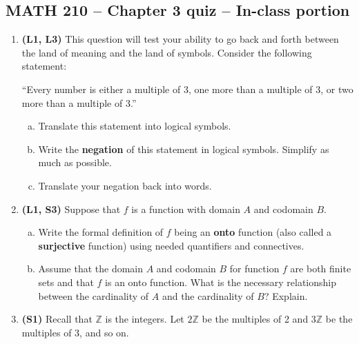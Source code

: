\documentclass[12pt]{article}
\begin{document}
\pagestyle{empty}
\begin{center}
\section*{MATH 210 -- Chapter 3 quiz -- In-class portion}
\end{center}
\begin{enumerate}
	
\item %
\textbf{(L1, L3)}
This question will test your ability to go back and forth between the land of meaning and the land of symbols. Consider the following statement:
\begin{center}
	``Every number is either a multiple of 3, one more than a multiple of 3, or two more than a multiple of 3.''
\end{center}
\begin{enumerate}[(a)]
	\item Translate this statement into logical symbols.
	
	\item Write the \textbf{negation} of this statement in logical symbols. Simplify as much as possible.
	
	\item Translate your negation back into words.
	
\end{enumerate}

\item %
\textbf{(L1, S3)} Suppose that $f$ is a function with domain $A$ and codomain $B$.

\begin{enumerate}[(a)]
	\item
	Write the formal definition of $f$ being an \textbf{onto} function (also called a \textbf{surjective} function) using needed quantifiers and connectives.
	
	\item
	Assume that the domain $A$ and codomain $B$ for function $f$ are both finite sets and that $f$ is an onto function. What is the necessary relationship between the cardinality of $A$ and the cardinality of $B$?  Explain.
\end{enumerate}

	
\item %
\textbf{(S1)}
Recall that $\mathbb{Z}$ is the integers. Let $2\mathbb{Z}$ be the multiples of 2 and $3\mathbb{Z}$ be the multiples of 3, and so on.


\end{enumerate}
\end{document}
